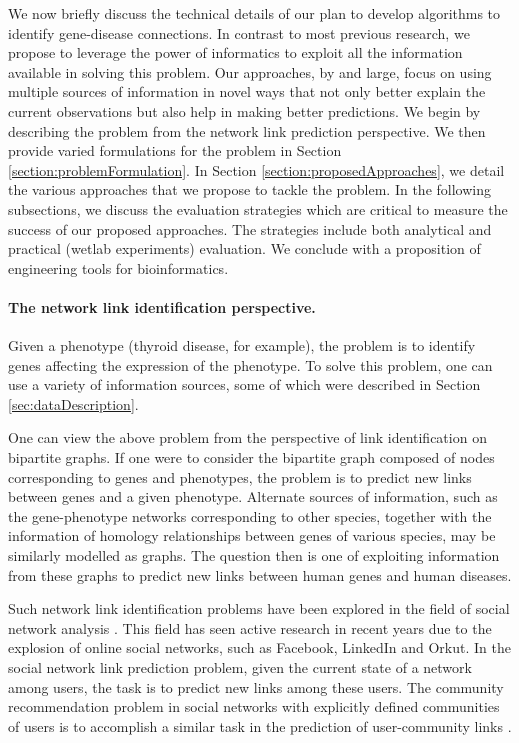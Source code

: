 We now briefly discuss the technical details of our plan to develop algorithms to identify gene-disease connections. In contrast to most previous research, we propose to leverage the power of informatics to exploit all the information available in solving this problem. Our approaches, by and large, focus on using multiple sources of information in novel ways that not only better explain the current observations but also help in making better predictions. We begin by describing the problem from the network link prediction perspective. We then provide varied formulations for the problem in Section \ref{section:problemFormulation}. In Section \ref{section:proposedApproaches}, we detail the various approaches that we propose to tackle the problem. In the following subsections, we discuss the evaluation strategies which are critical to measure the success of our proposed approaches. The strategies include both analytical and practical (wetlab experiments) evaluation. We conclude with a proposition of engineering tools for bioinformatics.

\paragraph*{The network link identification perspective.}
Given a phenotype (thyroid disease, for example), the problem is to identify genes affecting the expression of the phenotype. To solve this problem, one can use a variety of information sources, some of which were described in Section \ref{sec:dataDescription}.

One can view the above problem from the perspective of link identification on bipartite graphs. If one were to consider the bipartite graph composed of nodes corresponding to genes and phenotypes, the problem is to predict new links between genes and a given phenotype. Alternate sources of information, such as the gene-phenotype networks corresponding to other species, together with the information of homology relationships between genes of various species, may be similarly modelled as graphs. The question then is one of exploiting information from these graphs to predict new links between human genes and human diseases.

Such network link identification problems have been explored in the field of social network analysis \cite{KleinbergLinkPred}. This field has seen active research in recent years due to the explosion of online social networks, such as Facebook, LinkedIn and Orkut. In the social network link prediction problem, given the current state of a network among users, the task is to predict new links among these users. The community recommendation problem in social networks with explicitly defined communities of users is to accomplish a similar task in the prediction of user-community links \cite{GoogleCCF, GoogleCFLatent}.


